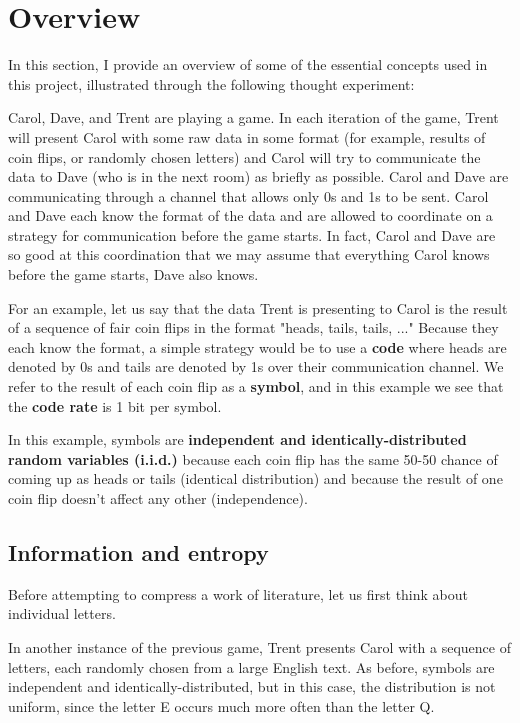 \chapter{Overview}
\label{chap:overview}

In this section, I provide an overview of some of the essential concepts used in this project, illustrated through the following thought experiment:

Carol, Dave, and Trent are playing a game. In each iteration of the game, Trent will present Carol with some raw data in some format (for example, results of coin flips, or randomly chosen letters) and Carol will try to communicate the data to Dave (who is in the next room) as briefly as possible. Carol and Dave are communicating through a channel that allows only 0s and 1s to be sent. Carol and Dave each know the format of the data and are allowed to coordinate on a strategy for communication before the game starts. In fact, Carol and Dave are so good at this coordination that we may assume that everything Carol knows before the game starts, Dave also knows.

For an example, let us say that the data Trent is presenting to Carol is the result of a sequence of fair coin flips in the format "heads, tails, tails, ..." Because they each know the format, a simple strategy would be to use a \textbf{code} where heads are denoted by 0s and tails are denoted by 1s over their communication channel. We refer to the result of each coin flip as a \textbf{symbol}, and in this example we see that the \textbf{code rate} is 1 bit per symbol.

In this example, symbols are \textbf{independent and identically-distributed random variables (i.i.d.)} because each coin flip has the same 50-50 chance of coming up as heads or tails (identical distribution) and because the result of one coin flip doesn't affect any other (independence).

\section{Information and entropy}
\label{sec:information_and_entropy}

Before attempting to compress a work of literature, let us first think about individual letters.

In another instance of the previous game, Trent presents Carol with a sequence of letters, each randomly chosen from a large English text. As before, symbols are independent and identically-distributed, but in this case, the distribution is not uniform, since the letter E occurs much more often than the letter Q.

